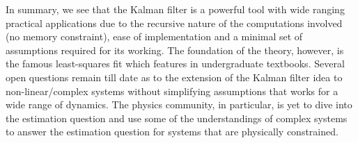 \documentclass{resonance}
\begin{document}
In summary, we see that the Kalman filter is a powerful tool with wide ranging practical applications due to the recursive nature of the computations involved (no memory constraint), ease of implementation and a minimal set of assumptions required for its working. The foundation of the theory, however, is the famous least-squares fit which features in undergraduate textbooks. Several open questions remain till date as to the extension of the Kalman filter idea to non-linear/complex systems without simplifying assumptions that works for a wide range of dynamics. The physics community, in particular, is yet to dive into the estimation question and use some of the understandings of complex systems to answer the estimation question for systems that are physically constrained.




\end{document}
